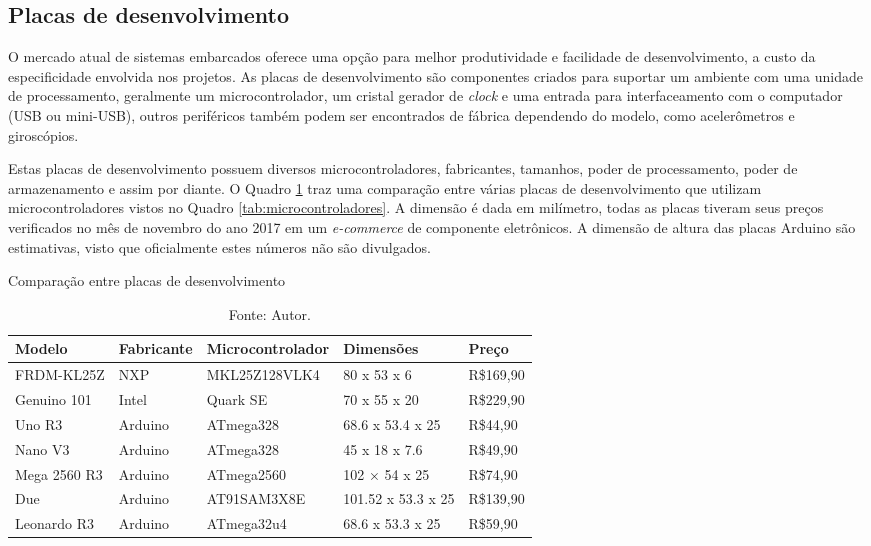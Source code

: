 \subsection{Placas de desenvolvimento} 
\label{sec:placasdedesenvolvimento}

O mercado atual de sistemas embarcados oferece uma opção para melhor produtividade e facilidade de desenvolvimento, a custo da especificidade envolvida nos projetos. As placas de desenvolvimento são componentes criados para suportar um ambiente com uma unidade de processamento, geralmente um microcontrolador, um cristal gerador de \textit{clock} e uma entrada para interfaceamento com o computador (USB ou mini-USB), outros periféricos também podem ser encontrados de fábrica dependendo do modelo, como acelerômetros e giroscópios. 

Estas placas de desenvolvimento possuem diversos microcontroladores, fabricantes, tamanhos, poder de processamento, poder de armazenamento e assim por diante. O Quadro \ref{tab:placasdedesenvolvimento} traz uma comparação entre várias placas de desenvolvimento que utilizam microcontroladores vistos no Quadro \ref{tab:microcontroladores}. A dimensão é dada em milímetro, todas as placas tiveram seus preços verificados no mês de novembro do ano 2017 em um \textit{e-commerce} de componente eletrônicos\cite{filipeflop}. A dimensão de altura das placas Arduino são estimativas, visto que oficialmente estes números não são divulgados. 

\begin{table}[!htb]
	\centering
	\caption{Comparação entre placas de desenvolvimento}
	\label{tab:placasdedesenvolvimento}
	\begin{tabular}{|l|l|l|l|l|}
	\hline
	\rowcolor[HTML]{9B9B9B} 
	\textbf{Modelo}      & \textbf{Fabricante} & \textbf{Microcontrolador} & \textbf{Dimensões} & \textbf{Preço} \\ \hline
	FRDM-KL25Z		   & NXP                 & MKL25Z128VLK4             & 80 x 53 x 6        & R\$169,90      \\ \hline
	Genuino 101        & Intel               & Quark SE                  & 70 x 55 x 20       & R\$229,90      \\ \hline
	Uno R3             & Arduino             & ATmega328                 & 68.6 x 53.4 x 25   & R\$44,90       \\ \hline
	Nano V3            & Arduino             & ATmega328                 & 45 x 18 x 7.6      & R\$49,90       \\ \hline
	Mega 2560 R3       & Arduino             & ATmega2560                & 102 × 54 x 25      & R\$74,90       \\ \hline
	Due                & Arduino             & AT91SAM3X8E               & 101.52 x 53.3 x 25 & R\$139,90      \\ \hline
	Leonardo R3        & Arduino             & ATmega32u4                & 68.6 x 53.3 x 25   & R\$59,90       \\ \hline
	\end{tabular}
	\caption*{Fonte: Autor.}
\end{table}

